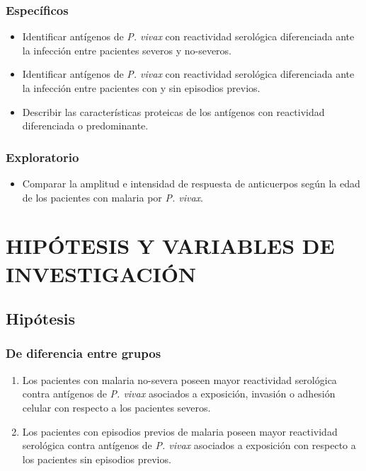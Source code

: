 \documentclass[
  a4paper]{article}
\providecommand{\tightlist}{%
  \setlength{\itemsep}{0pt}\setlength{\parskip}{0pt}}
\begin{document}
\hypertarget{especuxedficos}{%
\subsubsection{Específicos}\label{especuxedficos}}

\begin{itemize}
\item
  Identificar antígenos de \emph{P. vivax} con reactividad serológica
  diferenciada ante la infección entre pacientes severos y no-severos.
\item
  Identificar antígenos de \emph{P. vivax} con reactividad serológica
  diferenciada ante la infección entre pacientes con y sin episodios
  previos.
\item
  Describir las características proteicas de los antígenos con
  reactividad diferenciada o predominante.
\end{itemize}

\hypertarget{exploratorio}{%
\subsubsection{Exploratorio}\label{exploratorio}}

\begin{itemize}
\tightlist
\item
  Comparar la amplitud e intensidad de respuesta de anticuerpos según la
  edad de los pacientes con malaria por \emph{P. vivax}.
\end{itemize}

\hypertarget{hipuxf3tesis-y-variables-de-investigaciuxf3n}{%
\section{HIPÓTESIS Y VARIABLES DE
INVESTIGACIÓN}\label{hipuxf3tesis-y-variables-de-investigaciuxf3n}}

\hypertarget{hipuxf3tesis}{%
\subsection{Hipótesis}\label{hipuxf3tesis}}

\hypertarget{de-diferencia-entre-grupos}{%
\subsubsection{De diferencia entre
grupos}\label{de-diferencia-entre-grupos}}

\begin{enumerate}
\def\labelenumi{\arabic{enumi}.}
\item
  Los pacientes con malaria no-severa poseen mayor reactividad
  serológica contra antígenos de \emph{P. vivax} asociados a exposición,
  invasión o adhesión celular con respecto a los pacientes severos.
\item
  Los pacientes con episodios previos de malaria poseen mayor
  reactividad serológica contra antígenos de \emph{P. vivax} asociados a
  exposición con respecto a los pacientes sin episodios previos.
\end{enumerate}
\end{document}
